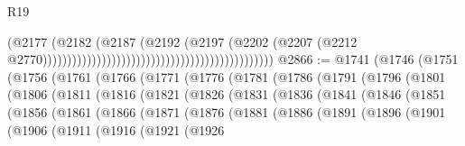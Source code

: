 \begin{lexlean}{R19}
\begin{coremodule}
                                                                                  (@2177
                                                                                    (@2182
                                                                                      (@2187
                                                                                        (@2192
                                                                                          (@2197
                                                                                            (@2202
                                                                                              (@2207
                                                                                                (@2212
                                                                                                  @2770)))))))))))))))))))))))))))))))))))))))))))))))
@2866 := @1741
    (@1746
      (@1751
        (@1756
          (@1761
            (@1766
              (@1771
                (@1776
                  (@1781
                    (@1786
                      (@1791
                        (@1796
                          (@1801
                            (@1806
                              (@1811
                                (@1816
                                  (@1821
                                    (@1826
                                      (@1831
                                        (@1836
                                          (@1841
                                            (@1846
                                              (@1851
                                                (@1856
                                                  (@1861
                                                    (@1866
                                                      (@1871
                                                        (@1876
                                                          (@1881
                                                            (@1886
                                                              (@1891
                                                                (@1896
                                                                  (@1901
                                                                    (@1906
                                                                      (@1911
                                                                        (@1916
                                                                          (@1921
                                                                            (@1926

\end{coremodule}
\end{lexlean}
